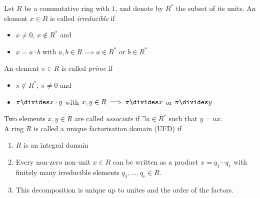 \documentclass[NumTh.tex]{subfiles}
\begin{document}
Let $R$ be a commutative ring with $1$,
and denote by $R^\ast$ the subset of its units.
An element $x \in R$ is called \emph{irreducible} if
\begin{itemize}
  \item $x \neq 0$, $x \nin R^\ast$ and
  \item $x = a \cdot b$ with $a,b \in R \implies a \in R^\ast$ or $b \in R^\ast$
\end{itemize}
An element $\pi \in R$ is called \emph{prime} if
\begin{itemize}
  \item $\pi \nin R^\ast$, $\pi \neq 0$ and
  \item $\pi \divides x \cdot y$ with $x,y \in R \implies \pi \divides x$ or $\pi \divides y$
\end{itemize}
Two elements $x,y \in R$ are called \emph{associate} if $\exists u \in R^\ast$ such that $y = ux$.
\\

A ring $R$ is called a unique factorisation domain (UFD) if
\begin{enumerate}
  \item $R$ is an integral domain
  \item Every non-zero non-unit $x \in R$ can be written as a product $x = q_1 \cdots q_r$ with finitely many irreducible elements $q_1,\dots,q_r \in R$.
  \item This decomposition is unique up to unites and the order of the factors.
\end{enumerate}
\end{document}
